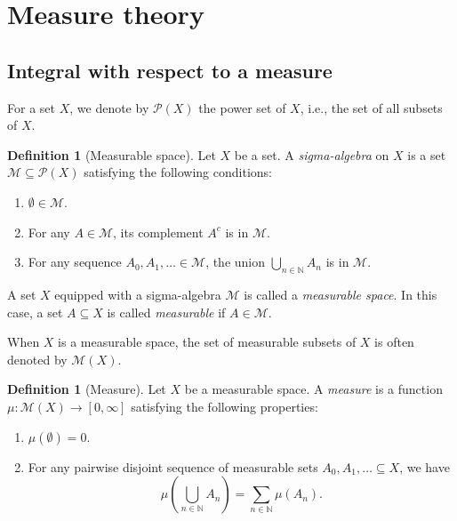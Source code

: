 \documentclass{article}
\theoremstyle{definition}
\newtheorem{definition}[theorem]{Definition}
\begin{document}
\section{Measure theory}

\subsection{Integral with respect to a measure}
For a set $X$, we denote by $\mathcal{P}(X)$ the power set of $X$,
i.e., the set of all subsets of $X$.

\begin{definition}[Measurable space]\label{def:measurable space}
  Let $X$ be a set.
  A \emph{sigma-algebra} on $X$ is a set
  $\mathcal{M} \subseteq \mathcal{P}(X)$
  satisfying the following conditions:
  \begin{enumerate}
    \item $\emptyset \in \mathcal{M}$.
    \item For any $A \in \mathcal{M}$, its complement $A^c$ is in $\mathcal{M}$.
    \item For any sequence $A_0, A_1, \dots \in \mathcal{M}$,
      the union $\bigcup_{n \in \mathbb{N}} A_n$ is in $\mathcal{M}$.
    \end{enumerate}
    A set $X$ equipped with a sigma-algebra $\mathcal{M}$ is called a \emph{measurable space}.
    In this case, a set $A \subseteq X$ is called \emph{measurable} if $A \in \mathcal{M}$.
\end{definition}

When $X$ is a measurable space,
the set of measurable subsets of $X$ is often denoted by $\mathcal{M}(X)$.

\begin{definition}[Measure]\label{def:measure}
  Let $X$ be a measurable space.
  A \emph{measure} is a function $\mu : \mathcal{M}(X) \to [0, \infty]$ satisfying
  the following properties:
  \begin{enumerate}
    \item $\mu(\emptyset) = 0$.
    \item For any pairwise disjoint sequence of measurable sets $A_0, A_1, \dots \subseteq X$, 
    we have
    \begin{equation*}
      \mu \left(\bigcup_{n \in \mathbb{N}} A_n\right) = \sum_{n \in \mathbb{N}} \mu(A_n).
    \end{equation*}
  \end{enumerate}
\end{definition}
\end{document}
